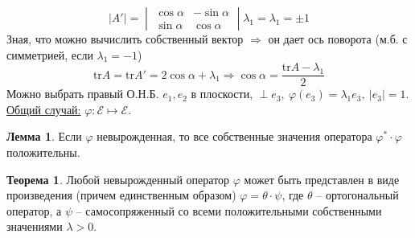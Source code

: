 \documentclass[a4paper, 12pt]{article}
\theoremstyle{definition}
\newtheorem*{theorem}{Теорема}
\newtheorem*{lemma}{Лемма}
\begin{document}
    $$|A'| = \begin{vmatrix}
        \cos \alpha & -\sin \alpha\\
        \sin \alpha & \cos \alpha
    \end{vmatrix} \lambda_1 = \lambda_1 = \pm 1$$
    Зная, что можно вычислить собственный вектор 
    $\Longrightarrow $ он дает ось поворота (м.б. с симметрией,
    если $\lambda_1 = -1$)
    $$\text{tr}A = \text{tr}A' = 2\cos \alpha + \lambda_1
    \Longrightarrow \cos \alpha = \frac{\text{tr}A - \lambda_1}
    {2}$$
    Можно выбрать правый О.Н.Б. $e_1,e_2$ в плоскости, $\perp
    e_3,\ \varphi(e_3) = \lambda_1e_3,\ |e_3| = 1.$\\
    \underline{Общий случай:} $\varphi:\mathcal{E} 
    \longmapsto \mathcal{E}.$
    \begin{lemma}
        Если $\varphi$ невырожденная, то все собственные 
        значения оператора $\varphi^*\cdot \varphi$
        положительны. 
    \end{lemma}
    \begin{theorem}
        Любой невырожденный оператор $\varphi$ может быть
        представлен в виде произведения (причем единственным 
        образом) $\varphi = \theta 
        \cdot\psi$, где $\theta$ -- ортогональный оператор, а 
        $\psi$ -- самосопряженный со всеми положительными 
        собственными значениями $\lambda > 0$. 
    \end{theorem}
\end{document}
